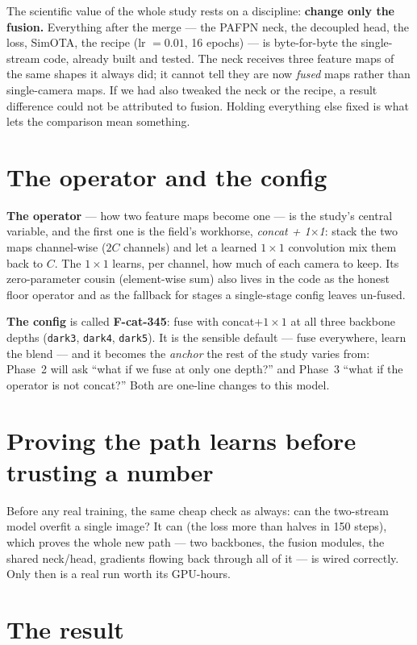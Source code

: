 \documentclass[../main.tex]{subfiles}
\begin{document}
The scientific value of the whole study rests on a discipline: \textbf{change only the fusion.}
Everything after the merge --- the PAFPN neck, the decoupled head, the loss, SimOTA, the recipe
(lr $=0.01$, 16 epochs) --- is byte-for-byte the single-stream code, already built and tested. The
neck receives three feature maps of the same shapes it always did; it cannot tell they are now
\emph{fused} maps rather than single-camera maps. If we had also tweaked the neck or the recipe, a
result difference could not be attributed to fusion. Holding everything else fixed is what lets the
comparison mean something.

\section{The operator and the config}

\textbf{The operator} --- how two feature maps become one --- is the study's central variable, and
the first one is the field's workhorse, \emph{concat + 1$\times$1}: stack the two maps channel-wise
($2C$ channels) and let a learned $1\times1$ convolution mix them back to $C$. The $1\times1$ learns,
per channel, how much of each camera to keep. Its zero-parameter cousin (element-wise sum) also
lives in the code as the honest floor operator and as the fallback for stages a single-stage config
leaves un-fused.

\textbf{The config} is called \textbf{F-cat-345}: fuse with concat+$1\times1$ at all three backbone
depths (\texttt{dark3}, \texttt{dark4}, \texttt{dark5}). It is the sensible default --- fuse
everywhere, learn the blend --- and it becomes the \emph{anchor} the rest of the study varies from:
Phase~2 will ask ``what if we fuse at only one depth?'' and Phase~3 ``what if the operator is not
concat?'' Both are one-line changes to this model.

\section{Proving the path learns before trusting a number}

Before any real training, the same cheap check as always: can the two-stream model overfit a single
image? It can (the loss more than halves in 150 steps), which proves the whole new path ---
two backbones, the fusion modules, the shared neck/head, gradients flowing back through all of it ---
is wired correctly. Only then is a real run worth its GPU-hours.

\section{The result}
\end{document}
